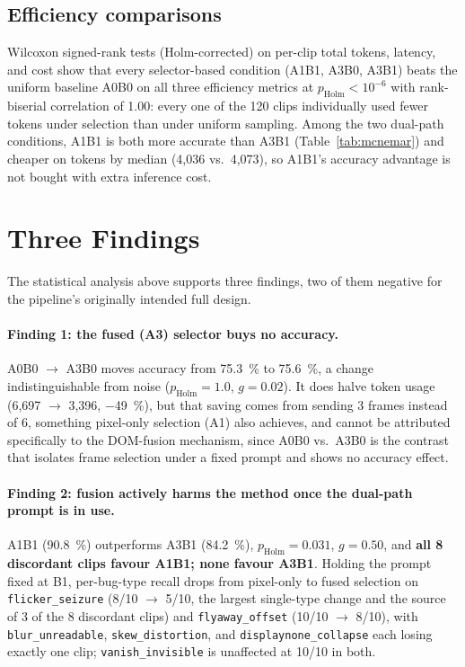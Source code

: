 \subsection{Efficiency comparisons}
Wilcoxon signed-rank tests (Holm-corrected) on per-clip total tokens, latency, and cost show that every selector-based condition (A1B1, A3B0, A3B1) beats the uniform baseline A0B0 on all three efficiency metrics at $p_\text{Holm} < 10^{-6}$ with rank-biserial correlation of \num{1.00}: every one of the 120 clips individually used fewer tokens under selection than under uniform sampling. Among the two dual-path conditions, A1B1 is both more accurate than A3B1 (Table~\ref{tab:mcnemar}) and cheaper on tokens by median (4{,}036 vs.\ 4{,}073), so A1B1's accuracy advantage is not bought with extra inference cost.

\section{Three Findings}
\label{sec:results-findings}
The statistical analysis above supports three findings, two of them negative for the pipeline's originally intended full design.

\paragraph{Finding 1: the fused (A3) selector buys no accuracy.} A0B0 $\to$ A3B0 moves accuracy from \SI{75.3}{\percent} to \SI{75.6}{\percent}, a change indistinguishable from noise ($p_\text{Holm}=1.0$, $g=0.02$). It does halve token usage (6{,}697 $\to$ 3{,}396, $-$\SI{49}{\percent}), but that saving comes from sending 3 frames instead of 6, something pixel-only selection (A1) also achieves, and cannot be attributed specifically to the DOM-fusion mechanism, since A0B0 vs.\ A3B0 is the contrast that isolates frame selection under a fixed prompt and shows no accuracy effect.

\paragraph{Finding 2: fusion actively harms the method once the dual-path prompt is in use.} A1B1 (\SI{90.8}{\percent}) outperforms A3B1 (\SI{84.2}{\percent}), $p_\text{Holm}=0.031$, $g=0.50$, and \textbf{all 8 discordant clips favour A1B1; none favour A3B1}. Holding the prompt fixed at B1, per-bug-type recall drops from pixel-only to fused selection on \texttt{flicker\_seizure} (8/10 $\to$ 5/10, the largest single-type change and the source of 3 of the 8 discordant clips) and \texttt{flyaway\_offset} (10/10 $\to$ 8/10), with \texttt{blur\_unreadable}, \texttt{skew\_distortion}, and \texttt{displaynone\_collapse} each losing exactly one clip; \texttt{vanish\_invisible} is unaffected at 10/10 in both.

